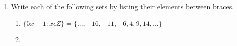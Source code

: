 \documentclass[../main.tex]{subfiles}
\begin{document}
\renewcommand{\labelenumi}{\Alph{enumi}}
\begin{enumerate}
  \item Write each of the following sets by listing their elements between braces.

    \renewcommand{\labelenumii}{\arabic{enumii}}
    \begin{enumerate}
      \item $\{5x-1: x \epsilon Z\} = \{..., -16, -11, -6, 4, 9, 14,...\}$
      \item 
    \end{enumerate}

\end{enumerate}
\end{document}
